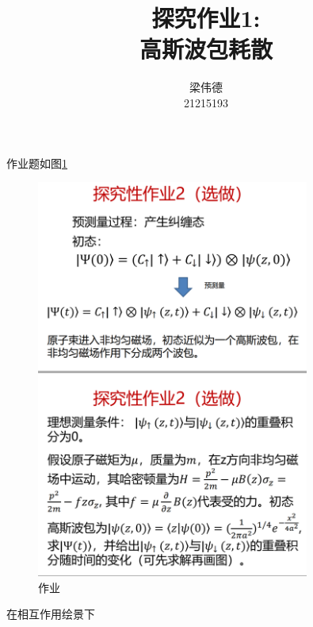 \documentclass{ctexart}
\author{梁伟德\\ 21215193}
\title{探究作业1:\\\textbf{高斯波包耗散}}
\begin{document}
\maketitle

作业题如图\ref{fig:h2}
\begin{figure}
    \centering
    \includegraphics[width = 0.8\textwidth]{探究2作业.png}
    \caption{作业}\label{fig:h2}
\end{figure}
在相互作用绘景下
\end{document}
